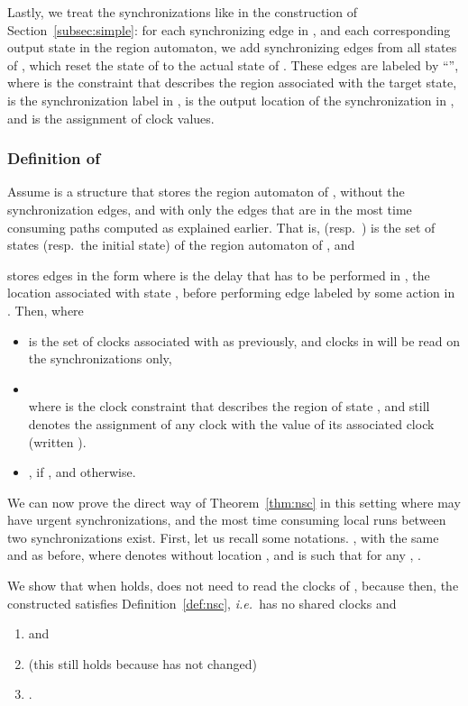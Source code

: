 \documentclass{LMCS}
\theoremstyle{plain}\newtheorem*{prop11}{Proposition~\ref{prop:states} bis}
\def\ie{{\em i.e.\ }}
\begin{document}
Lastly, we treat the synchronizations like in the construction of
Section~\ref{subsec:simple}: for each synchronizing edge in , and each
corresponding output state in the region automaton,
we add synchronizing edges from all states of , which reset the state
of  to the actual state of . These edges are labeled by
``'', where  is the constraint that
describes the region  associated with the target state,  is the
synchronization label in ,  is the output location of the
synchronization in , and  is the assignment of clock values.



\subsubsection*{Definition of }
Assume  is a structure that
stores the region automaton of , without the synchronization edges,
and with only the edges that are in the most time consuming paths computed as explained earlier.
That is,  (resp.\ ) is the set of states (resp.\ the initial state)
of the region automaton of , and

stores edges in the form \mbox{}
where  is the delay that has to be performed in , the location
associated with state , before performing edge  labeled by some
action in .
Then,  where
\begin{itemize}
  \item  is the set of clocks associated with  as previously,
  and clocks in  will be read on the synchronizations only,
  \item \\ where  is the clock constraint that describes the region of state ,
  and
   still denotes the assignment of any clock 
  with the value of its associated clock  (written ).
  \item ,  if ,
  and  otherwise.
\end{itemize}



We can now prove the direct way of Theorem~\ref{thm:nsc} in this setting
where  may have urgent synchronizations, and the most time consuming
local runs between two synchronizations exist.
First, let us recall some notations.
, with the same
 and  as before,
 where  denotes
 without location ,
and  is such that for any
, .
\hfill

\noindent We show that when  holds,  does not need to read the clocks of
, because then, the constructed  satisfies Definition~\ref{def:nsc},
\ie has no shared clocks and
  \begin{enumerate}
    \item  and
    \item  (this still holds because
     has not changed)
    \item .
  \end{enumerate}
\end{document}

